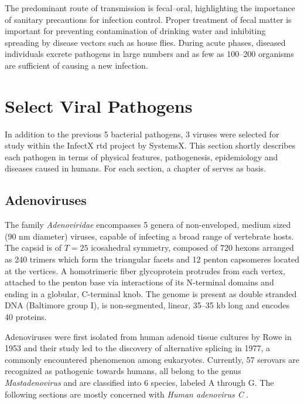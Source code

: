 The predominant route of transmission is fecal--oral, highlighting the importance of sanitary precautions for infection control. Proper treatment of fecal matter is important for preventing contamination of drinking water and inhibiting spreading by disease vectors such as house flies. During acute phases, diseased individuals excrete pathogens in large numbers and as few as 100--200 organisms are sufficient of causing a new infection.

\section{Select Viral Pathogens}

In addition to the previous 5 bacterial pathogens, 3 viruses were selected for study within the InfectX \gls{rtd} project by SystemsX. This section shortly describes each pathogen in terms of physical features, pathogenesis, epidemiology and diseases caused in humans. For each section, a chapter of \cite{Craighead2000} serves as basis.

\subsection{Adenoviruses}
The family \textit{Adenoviridae} encompasses 5 genera of non-enveloped, medium sized (90 nm diameter) viruses, capable of infecting a broad range of vertebrate hosts. The capsid is of $T=25$ icosahedral symmetry, composed of 720 hexons arranged as 240 trimers which form the triangular facets and 12 penton capsomeres located at the vertices. A homotrimeric fiber glycoprotein protrudes from each vertex, attached to the penton base via interactions of its N-terminal domains and ending in a globular, C-terminal knob. The genome is present as double stranded DNA (Baltimore group I), is non-segmented, linear, 35--35 kb long and encodes 40 proteins.

Adenoviruses were first isolated from human adenoid tissue cultures by Rowe in 1953 and their study led to the discovery of alternative splicing in 1977, a commonly encountered phenomenon among eukaryotes. Currently, 57 serovars are recognized as pathogenic towards humans, all belong to the genus \textit{Mastadenovirus} and are classified into 6 species, labeled A through G. The following sections are mostly concerned with \textit{Human adenovirus C} \citep{Lenaerts2008}.

